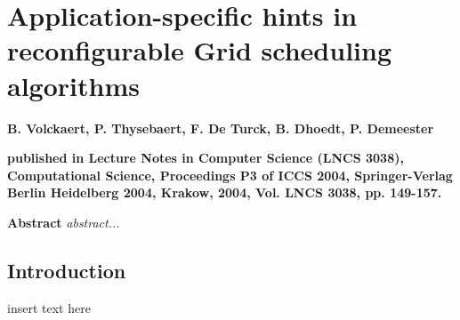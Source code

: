 
\graphicspath{{chapt_dutch/}{intro/}{chapt2/}{chapt3/}{chapt4/}{chapt5/}}

\renewcommand\evenpagerightmark{{\scshape\small Appendix B}}
\renewcommand\oddpageleftmark{{\scshape\small Application-specific hints in reconfigurable Grid scheduling algorithms}}

\renewcommand{\bibname}{References}

\hyphenation{}

\chapter[Application-specific hints in reconfigurable Grid scheduling algorithms]%
 {Application-specific hints in reconfigurable Grid scheduling algorithms}
\label{app2}

\par{\large{\textbf{B. Volckaert, P. Thysebaert, F. De Turck, B. Dhoedt, P. Demeester}}}
\vspace{0.2in}
\par{\noindent\textbf{published in Lecture Notes in Computer Science (LNCS 3038), Computational Science, Proceedings P3 of ICCS 2004, Springer-Verlag Berlin Heidelberg 2004, Krakow, 2004, Vol. LNCS 3038, pp. 149-157.}}
\vspace{0.1in}

\par{\bf{Abstract}}
\emph{
  abstract...
}


\section{Introduction}
insert text here

\lipsum




\clearpage{\pagestyle{empty}\cleardoublepage}